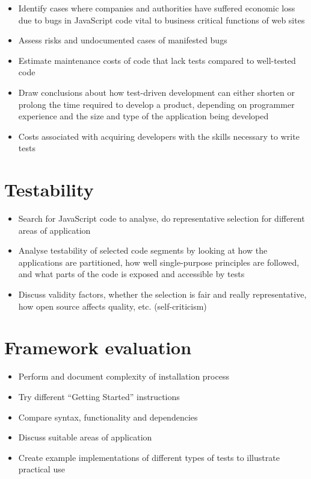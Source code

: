 \documentclass[11pt]{article}
\begin{document}
\begin{itemize}
  \item Identify cases where companies and authorities have suffered economic loss due to bugs in JavaScript code vital to business critical functions of web sites
  \item Assess risks and undocumented cases of manifested bugs
  \item Estimate maintenance costs of code that lack tests compared to well-tested code
  \item Draw conclusions about how test-driven development can either shorten or prolong the time required to develop a product, depending on programmer experience and the size and type of the application being developed
  \item Costs associated with acquiring developers with the skills necessary to write tests
\end{itemize}

\section{Testability}

\begin{itemize}
  \item Search for JavaScript code to analyse, do representative selection for different areas of application
  \item Analyse testability of selected code segments by looking at how the applications are partitioned, how well single-purpose principles are followed, and what parts of the code is exposed and accessible by tests
  \item Discuss validity factors, whether the selection is fair and really representative, how open source affects quality, etc. (self-criticism)
\end{itemize}

\section{Framework evaluation}

\begin{itemize}
  \item Perform and document complexity of installation process
  \item Try different ``Getting Started'' instructions
  \item Compare syntax, functionality and dependencies
  \item Discuss suitable areas of application
  \item Create example implementations of different types of tests to illustrate practical use
\end{itemize}
\end{document}
